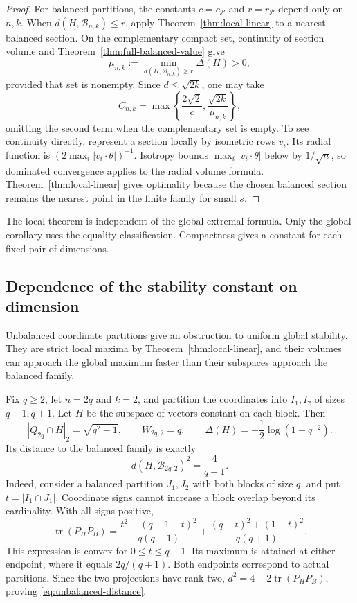 \documentclass[11pt,a4paper]{article}
\theoremstyle{remark}\newtheorem{remark}[theorem]{Remark}
\numberwithin{equation}{section}
\begin{document}
\begin{proof}
For balanced partitions, the constants $c=c_{\mathcal P}$ and
$r=r_{\mathcal P}$ depend only on $n,k$. When
$d(H,\mathcal B_{n,k})\le r$, apply Theorem~\ref{thm:local-linear} to a
nearest balanced section. On the complementary compact set, continuity
of section volume and Theorem~\ref{thm:full-balanced-value} give
\[
 \mu_{n,k}:=\min_{d(H,\mathcal B_{n,k})\ge r}\Delta(H)>0,
\]
provided that set is nonempty. Since $d\le\sqrt{2k}$, one may take
\[
 C_{n,k}=\max\left\{\frac{2\sqrt2}{c},
                       \frac{\sqrt{2k}}{\mu_{n,k}}\right\},
\]
omitting the second term when the complementary set is empty.
To see continuity directly, represent a section locally by isometric
rows $v_i$. Its radial function is
$(2\max_i|v_i\cdot\theta|)^{-1}$. Isotropy bounds
$\max_i|v_i\cdot\theta|$ below by $1/\sqrt n$, so dominated convergence
applies to the radial volume formula. Theorem~\ref{thm:local-linear}
gives optimality because the chosen balanced section remains the
nearest point in the finite family for small $s$.
\end{proof}

The local theorem is independent of the global extremal formula. Only
the global corollary uses the equality classification. Compactness gives a constant for each fixed pair of dimensions.

\subsection{Dependence of the stability constant on dimension}
\label{sec:dimension-obstruction}
Unbalanced coordinate partitions give an obstruction to uniform global
stability. They are strict local maxima by Theorem~\ref{thm:local-linear},
and their volumes can approach the global maximum faster than their
subspaces approach the balanced family.

Fix $q\ge2$, let $n=2q$ and $k=2$, and partition the coordinates into
$I_1,I_2$ of sizes $q-1,q+1$. Let $H$ be the subspace of vectors
constant on each block. Then
\[
 |Q_{2q}\cap H|_2=\sqrt{q^2-1},\qquad W_{2q,2}=q,\qquad
 \Delta(H)=-\frac12\log(1-q^{-2}).
\]
Its distance to the balanced family is exactly
\begin{equation}\label{eq:unbalanced-distance}
 d(H,\mathcal B_{2q,2})^2=\frac4{q+1}.
\end{equation}
Indeed, consider a balanced partition $J_1,J_2$ with both blocks of size
$q$, and put $t=|I_1\cap J_1|$. Coordinate signs cannot increase a block
overlap beyond its cardinality. With all signs positive,
\[
 \operatorname{tr}(P_HP_B)
 =\frac{t^2+(q-1-t)^2}{q(q-1)}
  +\frac{(q-t)^2+(1+t)^2}{q(q+1)}.
\]
This expression is convex for $0\le t\le q-1$. Its maximum is attained
at either endpoint, where it equals $2q/(q+1)$. Both endpoints correspond to
actual partitions. Since the two projections have rank two,
$d^2=4-2\operatorname{tr}(P_HP_B)$, proving
\eqref{eq:unbalanced-distance}.
\end{document}
